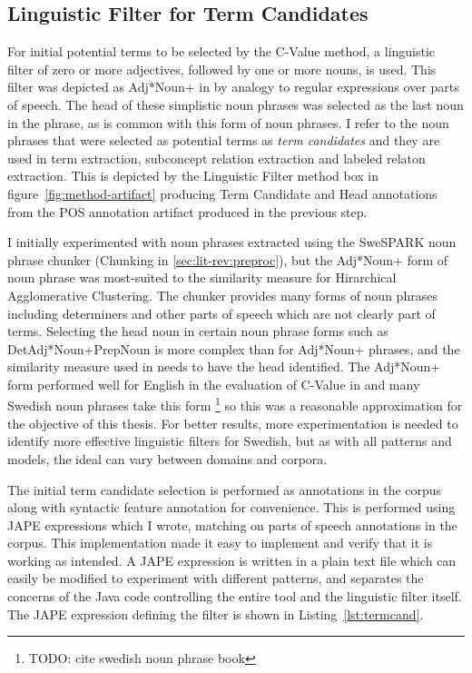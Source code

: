 \documentclass[a4paper]{report}
\newcommand{\todo}[1]{\footnote{{\color{red} TODO: #1}}}
\begin{document}
\subsection{Linguistic Filter for Term Candidates}
\label{subsec:results:term_cand_ling_filt}

For initial potential terms to be selected by the C-Value method, a linguistic filter of zero or more adjectives, followed by one or more nouns, is used.
This filter was depicted as Adj*Noun+ in \cite{Frantzi98CNCValue} by analogy to regular expressions over parts of speech.
The head of these simplistic noun phrases was selected as the last noun in the phrase, as is common with this form of noun phrases.
I refer to the noun phrases that were selected as potential terms as \emph{term candidates} and they are used in term extraction, subconcept relation extraction and labeled relaton extraction.
This is depicted by the Linguistic Filter method box in figure~\ref{fig:method-artifact} producing Term Candidate and Head annotations from the POS annotation artifact produced in the previous step.

I initially experimented with noun phrases extracted using the SweSPARK noun phrase chunker (Chunking in \ref{sec:lit-rev:preproc}), but the Adj*Noun+ form of noun phrase was most-suited to the similarity measure for Hirarchical Agglomerative Clustering.
The chunker provides many forms of noun phrases including determiners and other parts of speech which are not clearly part of terms.
Selecting the head noun in certain noun phrase forms such as DetAdj*Noun+PrepNoun is more complex than for Adj*Noun+ phrases, and the similarity measure used in \cite{Drymonas10OntoGain} needs to have the head identified.
The Adj*Noun+ form performed well for English in the evaluation of C-Value in \cite{Frantzi98CNCValue} and many Swedish noun phrases take this form \todo{cite swedish noun phrase book} so this was a reasonable approximation for the objective of this thesis.
For better results, more experimentation is needed to identify more effective linguistic filters for Swedish, but as with all patterns and models, the ideal can vary between domains and corpora.

The initial term candidate selection is performed as annotations in the corpus along with syntactic feature annotation for convenience.
This is performed using JAPE expressions which I wrote, matching on parts of speech annotations in the corpus.
This implementation made it easy to implement and verify that it is working as intended.
A JAPE expression is written in a plain text file which can easily be modified to experiment with different patterns, and separates the concerns of the Java code controlling the entire tool and the linguistic filter itself.
The JAPE expression defining the filter is shown in Listing~\ref{lst:termcand}.
\end{document}
